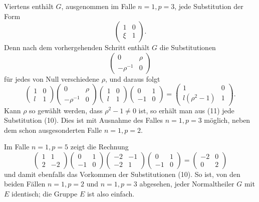 \documentclass[11pt]{article}
\begin{document}
Viertens enthält $G$, ausgenommen im Falle $n=1,p=3$, jede Substitution der Form
\begin{equation}
 \begin{pmatrix}1&0\\ \xi&1\end{pmatrix}. \tag{10}
\end{equation}
Denn nach dem vorhergehenden Schritt enthält $G$ die Substitutionen
\[
 \begin{pmatrix}0&\rho\\-\rho^{-1}&0\end{pmatrix}
\]
für jedes von Null verschiedene $\rho$, und daraus folgt
\begin{equation}
 \begin{pmatrix}1&0\\ l&1\end{pmatrix}
 \begin{pmatrix}0&\rho\\-\rho^{-1}&0\end{pmatrix}
 \begin{pmatrix}1&0\\ l&1\end{pmatrix}
 \begin{pmatrix}0&1\\-1&0\end{pmatrix}
 =
 \begin{pmatrix}1&0\\ l(\rho^2-1)&1\end{pmatrix}. \tag{11}
\end{equation}
Kann $\rho$ so gewählt werden, dass $\rho^2-1\ne0$ ist, so erhält man aus (11) jede Substitution (10). Dies ist mit Ausnahme des Falles $n=1,p=3$ möglich, neben dem schon ausgesonderten Falle $n=1,p=2$.

Im Falle $n=1,p=5$ zeigt die Rechnung
\[
 \begin{pmatrix}1&1\\2&-2\end{pmatrix}
 \begin{pmatrix}0&1\\-1&0\end{pmatrix}
 \begin{pmatrix}-2&-1\\-2&1\end{pmatrix}
 \begin{pmatrix}0&1\\-1&0\end{pmatrix}
 =
 \begin{pmatrix}-2&0\\0&2\end{pmatrix}
\]
und damit ebenfalls das Vorkommen der Substitutionen (10). So ist, von den beiden Fällen $n=1,p=2$ und $n=1,p=3$ abgesehen, jeder Normaltheiler $G$ mit $E$ identisch; die Gruppe $E$ ist also einfach.
\end{document}
